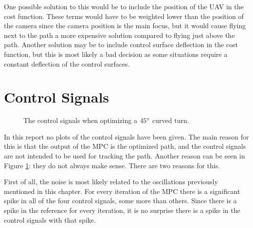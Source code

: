 One possible solution to this would be to include the position of the UAV in the cost function. These terms would have to be weighted lower than the position of the camera since the camera position is the main focus, but it would cause flying next to the path a more expensive solution compared to flying just above the path. Another solution may be to include control surface deflection in the cost function, but this is most likely a bad decision as some situations require a constant deflection of the control surfaces.


\section{Control Signals}

\begin{figure}[]
	\centering
	\caption{The control signals when optimizing a $45\degree$ curved turn.}
	\label{fig:control_signals}
\end{figure}

In this report no plots of the control signals have been given. The main reason for this is that the output of the MPC is the optimized path, and the control signals are not intended to be used for tracking the path. Another reason can be seen in Figure \ref{fig:control_signals}: they do not always make sense. There are two reasons for this.

First of all, the noise is most likely related to the oscillations previously mentioned in this chapter. For every iteration of the MPC there is a significant spike in all of the four control signals, some more than others. Since there is a spike in the reference for every iteration, it is no surprise there is a spike in the control signals with that spike.

